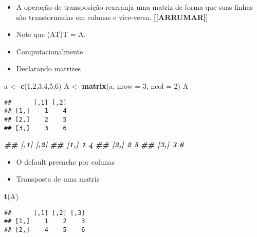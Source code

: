 \documentclass[
]{article}
\newenvironment{Shaded}{\begin{snugshade}}{\end{snugshade}}
\newcommand{\AttributeTok}[1]{\textcolor[rgb]{0.13,0.29,0.53}{#1}}
\newcommand{\DecValTok}[1]{\textcolor[rgb]{0.00,0.00,0.81}{#1}}
\newcommand{\DocumentationTok}[1]{\textcolor[rgb]{0.56,0.35,0.01}{\textbf{\textit{#1}}}}
\newcommand{\FunctionTok}[1]{\textcolor[rgb]{0.13,0.29,0.53}{\textbf{#1}}}
\newcommand{\NormalTok}[1]{#1}
\newcommand{\OtherTok}[1]{\textcolor[rgb]{0.56,0.35,0.01}{#1}}
\providecommand{\tightlist}{%
  \setlength{\itemsep}{0pt}\setlength{\parskip}{0pt}}
\begin{document}
\begin{itemize}
\item
  A operação de transposição rearranja uma matriz de forma que suas
  linhas são transformadas em colunas e vice-versa.
  \textbf{{[}{[}ARRUMAR{]}{]}}
\item
  Note que (AT)T = A.
\item
  Computacionalmente
\item
  Declarando matrizes
\end{itemize}

\begin{Shaded}
\begin{Highlighting}[]
\NormalTok{a }\OtherTok{\textless{}{-}} \FunctionTok{c}\NormalTok{(}\DecValTok{1}\NormalTok{,}\DecValTok{2}\NormalTok{,}\DecValTok{3}\NormalTok{,}\DecValTok{4}\NormalTok{,}\DecValTok{5}\NormalTok{,}\DecValTok{6}\NormalTok{)}
\NormalTok{A }\OtherTok{\textless{}{-}} \FunctionTok{matrix}\NormalTok{(a, }\AttributeTok{nrow =} \DecValTok{3}\NormalTok{, }\AttributeTok{ncol =} \DecValTok{2}\NormalTok{)}
\NormalTok{A}
\end{Highlighting}
\end{Shaded}

\begin{verbatim}
##      [,1] [,2]
## [1,]    1    4
## [2,]    2    5
## [3,]    3    6
\end{verbatim}

\begin{Shaded}
\begin{Highlighting}[]
\DocumentationTok{\#\# [,1] [,2]}
\DocumentationTok{\#\# [1,] 1 4}
\DocumentationTok{\#\# [2,] 2 5}
\DocumentationTok{\#\# [3,] 3 6}
\end{Highlighting}
\end{Shaded}

\begin{itemize}
\tightlist
\item
  O default preenche por colunas
\item
  Transposta de uma matriz
\end{itemize}

\begin{Shaded}
\begin{Highlighting}[]
\FunctionTok{t}\NormalTok{(A)}
\end{Highlighting}
\end{Shaded}

\begin{verbatim}
##      [,1] [,2] [,3]
## [1,]    1    2    3
## [2,]    4    5    6
\end{verbatim}
\end{document}
